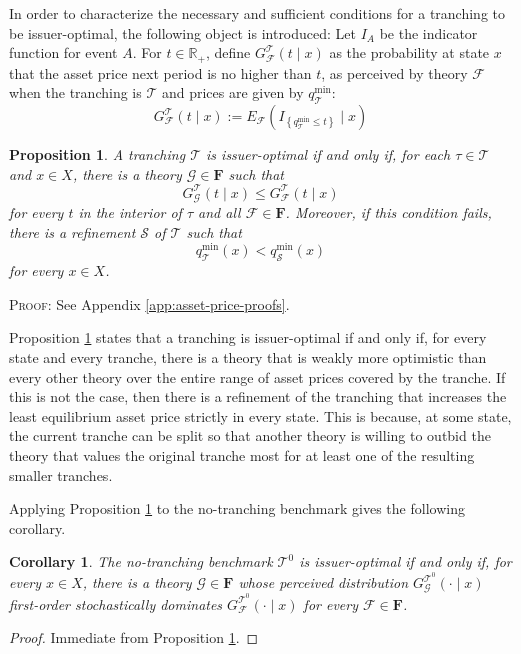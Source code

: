 \documentclass[11pt]{article}
\theoremstyle{plain}
\newtheorem{prp}{Proposition}%
\newtheorem{crl}{Corollary}%
\begin{document}
In order to characterize the necessary and sufficient conditions for a tranching to be issuer-optimal, the following object is introduced: Let $I_A$ be the indicator function for event $A$. For $t\in\mathbb{R}_+$, define $G^\mathcal{T}_\mathcal{F}\left(t\mid x\right)$ as the probability at state $x$ that the asset price  next period is no higher than $t$, as perceived by theory $\mathcal{F}$ when the tranching is $\mathcal{T}$ and prices are given by $q_{\mathcal{T}}^{\min}$:
\begin{equation*}
G^\mathcal{T}_\mathcal{F}\left(t\mid x\right) := E_{\mathcal{F}}\left(I_{\left\{q_{\mathcal{T}}^{\min}\leq t\right\}}\mid x\right)
\end{equation*}
\begin{prp} \label{mthm}
A tranching $\mathcal{T}$ is issuer-optimal if and only if, for each  $\tau\in\mathcal{T}$ and $x\in X$, there is a theory $\mathcal{G}\in\mathbf{F}$ such that
\begin{equation*}
G^{\mathcal{T}}_
{\mathcal{G}}
\left(t\mid x\right)
\leq
G^{\mathcal{T}}_
{\mathcal{F}}
\left(t\mid x\right)
\end{equation*}
for every $t$ in the interior of $\tau$ and all $\mathcal{F}\in\mathbf{F}$.
Moreover, if this condition fails, there is a refinement $\mathcal{S}$ of $\mathcal{T}$ such that
\begin{equation*}
q_{\mathcal{T}}^{\min}(x)<q_{\mathcal{S}}^{\min}(x)
\end{equation*}
for every $x\in X$.
\end{prp}
\textsc{Proof:} See Appendix \ref{app:asset-price-proofs}.

Proposition \ref{mthm} states that a tranching is issuer-optimal if and only if, for every state and every tranche, there is a theory that is weakly more optimistic than every other theory over the entire range of asset prices covered by the tranche. If this is not the case, then there is a refinement of the tranching that increases the least equilibrium asset price strictly in every state. This is because, at some state, the current tranche can be split so that another theory is willing to outbid the theory that values the original tranche most for at least one of the resulting smaller tranches.

Applying Proposition \ref{mthm} to the no-tranching benchmark gives the following corollary.
\begin{crl}
The no-tranching benchmark $\mathcal{T}^0$ is issuer-optimal if and only if, for every $x\in X$, there is a theory $\mathcal{G}\in\mathbf{F}$ whose perceived distribution
$G^{\mathcal{T}^0}_{\mathcal{G}}
\left(\cdot\mid x\right)$
first-order stochastically dominates
$G^{\mathcal{T}^0}_{\mathcal{F}}
\left(\cdot\mid x\right)$
for every $\mathcal{F}\in\mathbf{F}$.
\end{crl}
\begin{proof}
Immediate from Proposition \ref{mthm}.
\end{proof}
\end{document}
